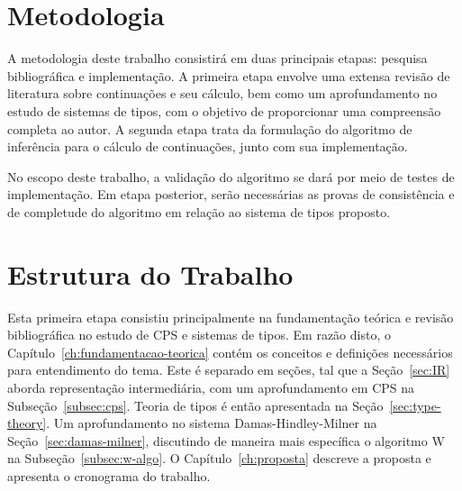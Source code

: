 \section{Metodologia}\label{sec:metodologia}

A metodologia deste trabalho consistirá em duas principais etapas: pesquisa bibliográfica e implementação.
A primeira etapa envolve uma extensa revisão de literatura sobre continuações e seu cálculo, bem como um aprofundamento no estudo de sistemas de tipos, com o objetivo de proporcionar uma compreensão completa ao autor.
A segunda etapa trata da formulação do algoritmo de inferência para o cálculo de continuações, junto com sua implementação.

No escopo deste trabalho, a validação do algoritmo se dará por meio de testes de implementação.
Em etapa posterior, serão necessárias as provas de consistência e de completude do algoritmo em relação ao sistema de tipos proposto.

\section{Estrutura do Trabalho}\label{sec:estrutura-trabalho}

Esta primeira etapa consistiu principalmente na fundamentação teórica e revisão bibliográfica no estudo de CPS e sistemas de tipos.
Em razão disto, o Capítulo~\ref{ch:fundamentacao-teorica} contém os conceitos e definições necessários para entendimento do tema.
Este é separado em seções, tal que a Seção~\ref{sec:IR} aborda representação intermediária, com um aprofundamento em CPS na Subseção~\ref{subsec:cps}.
Teoria de tipos é então apresentada na Seção~\ref{sec:type-theory}.
Um aprofundamento no sistema Damas-Hindley-Milner na Seção~\ref{sec:damas-milner}, discutindo de maneira mais específica o algoritmo W na Subseção~\ref{subsec:w-algo}.
O Capítulo~\ref{ch:proposta} descreve a proposta e apresenta o cronograma do trabalho.
